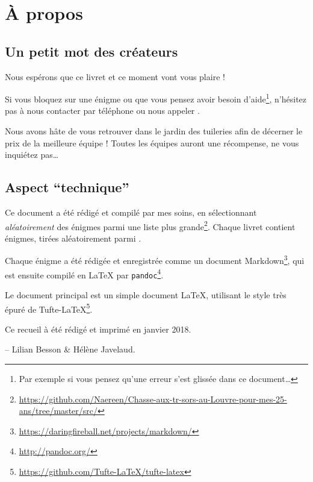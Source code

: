 \chapter{À propos}

\section*{Un petit mot des créateurs}

Nous espérons que ce livret et ce moment vont vous plaire !

Si vous bloquez sur une énigme ou que vous pensez avoir besoin d'aide\footnote{Par exemple si vous pensez qu'une erreur s'est glissée dans ce document…}, n'hésitez pas à nous contacter par téléphone ou nous appeler
.

Nous avons hâte de vous retrouver dans le jardin des tuileries afin de décerner le prix de la meilleure équipe !
Toutes les équipes auront une récompense, ne vous inquiétez pas…


\section*{Aspect ``technique''}
Ce document a été rédigé et compilé par mes soins, en sélectionnant \emph{aléatoirement} des énigmes parmi une liste plus grande\footnote{\url{https://github.com/Naereen/Chasse-aux-tr-sors-au-Louvre-pour-mes-25-ans/tree/master/src/}}.
Chaque livret contient \nbenigmes{} énigmes, tirées aléatoirement parmi \totalnbenigmes.

Chaque énigme a été rédigée et enregistrée comme un document Markdown\footnote{\url{https://daringfireball.net/projects/markdown/}},
qui est ensuite compilé en \LaTeX{} par \texttt{pandoc}\footnote{\url{http://pandoc.org/}}.

Le document principal est un simple document \LaTeX,
utilisant le style très épuré de Tufte-\LaTeX{}\footnote{\url{https://github.com/Tufte-LaTeX/tufte-latex}}.

Ce recueil à été rédigé et imprimé en janvier 2018.

-- Lilian Besson \& Hélène Javelaud.